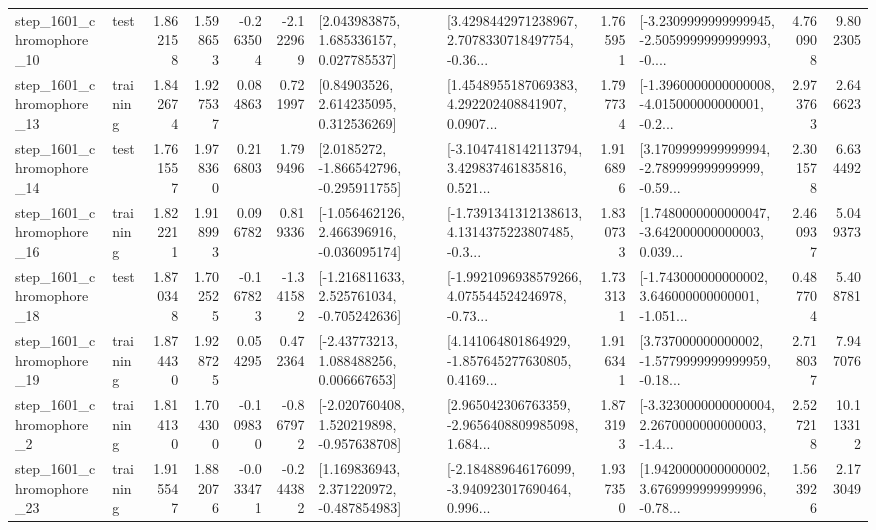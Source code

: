 \begin{tabular}{llrrrrllrlrr}
 step\_1601\_chromophore\_10 &      test &      1.862158 &    1.598653 &     -0.263504 & -2.122969 &     [2.043983875, 1.685336157, 0.027785537] &  [3.4298442971238967, 2.7078330718497754, -0.36... &       1.765951 &  [-3.2309999999999945, -2.5059999999999993, -0.... &            4.760908 &          9.802305 \\
 step\_1601\_chromophore\_13 &  training &      1.842674 &    1.927537 &      0.084863 &  0.721997 &      [0.84903526, 2.614235095, 0.312536269] &  [1.4548955187069383, 4.292202408841907, 0.0907... &       1.797734 &  [-1.3960000000000008, -4.015000000000001, -0.2... &            2.973763 &          2.646623 \\
 step\_1601\_chromophore\_14 &      test &      1.761557 &    1.978360 &      0.216803 &  1.799496 &     [2.0185272, -1.866542796, -0.295911755] &  [-3.1047418142113794, 3.429837461835816, 0.521... &       1.916896 &  [3.1709999999999994, -2.789999999999999, -0.59... &            2.301578 &          6.634492 \\
 step\_1601\_chromophore\_16 &  training &      1.822211 &    1.918993 &      0.096782 &  0.819336 &   [-1.056462126, 2.466396916, -0.036095174] &  [-1.7391341312138613, 4.1314375223807485, -0.3... &       1.830733 &  [1.7480000000000047, -3.642000000000003, 0.039... &            2.460937 &          5.049373 \\
 step\_1601\_chromophore\_18 &      test &      1.870348 &    1.702525 &     -0.167823 & -1.341582 &   [-1.216811633, 2.525761034, -0.705242636] &  [-1.9921096938579266, 4.075544524246978, -0.73... &       1.733131 &  [-1.743000000000002, 3.646000000000001, -1.051... &            0.487704 &          5.408781 \\
 step\_1601\_chromophore\_19 &  training &      1.874430 &    1.928725 &      0.054295 &  0.472364 &     [-2.43773213, 1.088488256, 0.006667653] &  [4.141064801864929, -1.857645277630805, 0.4169... &       1.916341 &  [3.737000000000002, -1.5779999999999959, -0.18... &            2.718037 &          7.947076 \\
  step\_1601\_chromophore\_2 &  training &      1.814130 &    1.704300 &     -0.109830 & -0.867972 &   [-2.020760408, 1.520219898, -0.957638708] &  [2.965042306763359, -2.9656408809985098, 1.684... &       1.873193 &  [-3.3230000000000004, 2.2670000000000003, -1.4... &            2.527218 &         10.113312 \\
 step\_1601\_chromophore\_23 &  training &      1.915547 &    1.882076 &     -0.033471 & -0.244382 &    [1.169836943, 2.371220972, -0.487854983] &  [-2.184889646176099, -3.940923017690464, 0.996... &       1.937350 &  [1.9420000000000002, 3.6769999999999996, -0.78... &            1.563926 &          2.173049 \\

\end{tabular}
